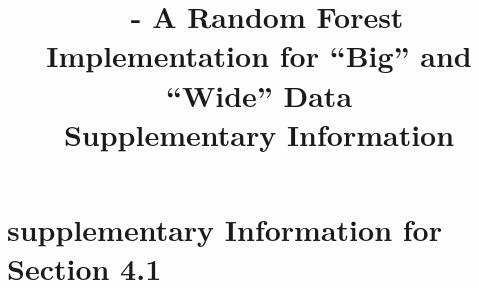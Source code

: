 \documentclass[11pt]{article}
\title{\cursedforest\ - A Random Forest Implementation for ``Big'' and ``Wide'' Data \\
Supplementary Information}
\author{}
\date{}
\begin{document}
\maketitle







\section{supplementary Information for Section 4.1}
\end{document}
